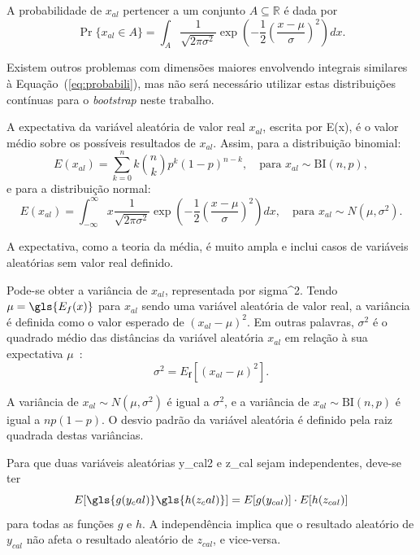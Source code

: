 A probabilidade de $x_{al}$ pertencer a um conjunto $A \subseteq \mathbb{R}$ é dada por
\begin{equation}
    \Pr\{x_{al} \in A\} = \int_{A} \frac{1}{\sqrt{2\pi\sigma^2}} \exp\left(-\frac{1}{2}\left(\frac{x-\mu}{\sigma}\right)^2\right)dx.
\label{eq:probabili}
\end{equation}

Existem outros problemas com dimensões maiores envolvendo integrais similares à Equação~(\ref{eq:probabili}), mas não será necessário utilizar estas distribuições contínuas para o \textit{bootstrap} neste trabalho.

A expectativa da variável aleatória de valor real $x_{al}$, escrita por \gls{E(x)}, é o valor médio sobre os possíveis resultados de $x_{al}$. Assim, para a distribuição binomial:
\begin{equation}
    E(x_{al}) = \sum_{k=0}^{n} k \binom{n}{k} p^k (1 - p)^{n-k}, \quad \text{para } x_{al} \sim \text{BI}(n,p),
\end{equation}
e para a distribuição normal:
\begin{equation}
    E(x_{al}) = \int_{-\infty}^{\infty} x \frac{1}{\sqrt{2\pi\sigma^2}} \exp\left(-\frac{1}{2}\left(\frac{x-\mu}{\sigma}\right)^2\right)dx, \quad \text{para } x_{al} \sim N(\mu,\sigma^2).
\label{eq:probabili2}
\end{equation}

A expectativa, como a teoria da média, é muito ampla e inclui casos de variáveis aleatórias sem valor real definido.

Pode-se obter a variância de $x_{al}$, representada por \gls{sigma^2}. Tendo $\mu = \gls{E_f(x)}$ para $x_{al}$ sendo uma variável aleatória de valor real, a variância é definida como o valor esperado de $(x_{al} - \mu)^2$. Em outras palavras, $\sigma^2$ é o quadrado médio das distâncias da variável aleatória $x_{al}$ em relação à sua expectativa $\mu$~\cite{Canty2001}:
\begin{equation}
    \sigma^2 = E_{\mathbf{f}}[(x_{al} - \mu)^2].
\end{equation}

A variância de $x_{al} \sim N(\mu, \sigma^2)$ é igual a $\sigma^2$, e a variância de $x_{al} \sim \text{BI}(n, p)$ é igual a $np(1 - p)$. O desvio padrão da variável aleatória é definido pela raiz quadrada destas variâncias.

Para que duas variáveis aleatórias \gls{y_cal2} e \gls{z_cal} sejam independentes, deve-se ter
\begin{equation}
    E[\gls{g(y_cal)} \gls{h(z_cal)}] = E[g(y_{cal})] \cdot E[h(z_{cal})]
\end{equation}
para todas as funções $g$ e $h$. A independência implica que o resultado aleatório de $y_{cal}$ não afeta o resultado aleatório de $z_{cal}$, e vice-versa.

